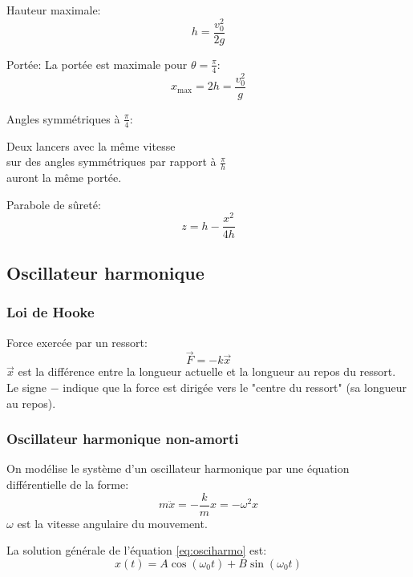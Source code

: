 \documentclass{article}
\numberwithin{equation}{section}
\begin{document}
Hauteur maximale:
\begin{equation}
	\boxed{h = \dfrac{v_0^2}{2g}}
\end{equation}

Portée:
La portée est maximale pour \(\theta = \frac{\pi}{4}\):
\begin{equation}
	x_{\text{max}} = 2h = \dfrac{v_0^2}{g}
\end{equation}

Angles symmétriques à \(\frac{\pi}{4}\):
\begin{center}
	Deux lancers avec la même vitesse \\ sur des angles symmétriques par rapport à \(\frac{\pi}{h}\) \\ auront la même portée.
\end{center}

Parabole de sûreté:
\begin{equation}
	\boxed{z = h - \dfrac{x^2}{4h}}
\end{equation}


\subsection{Oscillateur harmonique}
\subsubsection{Loi de Hooke}
Force exercée par un ressort:
\begin{equation}
	\boxed{\vec F = - k \vec x}
\end{equation}
\(\vec x\) est la différence entre la longueur actuelle et la longueur au repos du ressort. Le signe \(-\) indique que la force est dirigée vers le "centre du ressort" (sa longueur au repos).

\subsubsection{Oscillateur harmonique non-amorti}
On modélise le système d'un oscillateur harmonique par une équation différentielle de la forme:
\begin{equation} \label{eq:osciharmo}
	\boxed{ m \ddot x = - \frac{k}{m} x = - \omega^2 x }
\end{equation}
\(\omega\) est la vitesse angulaire du mouvement.

La solution générale de l'équation \ref{eq:osciharmo} est:
\begin{equation}
	\boxed{ x(t) = A \cos(\omega_0 t) + B \sin(\omega_0 t) }
\end{equation}
\end{document}
